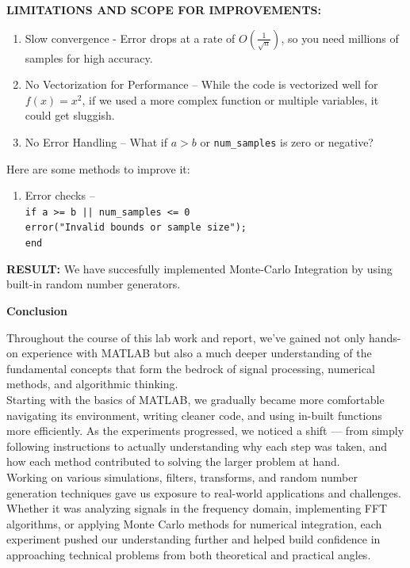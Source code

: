 \documentclass[12pt]{report}
\begin{document}
  \textbf{LIMITATIONS AND SCOPE FOR IMPROVEMENTS:}
  \begin{enumerate}
    \item Slow convergence - Error drops at a rate of  $O \left( \frac{1}{ \sqrt n} \right)$, so you need millions of samples for high accuracy.
    \item No Vectorization for Performance -- While the code is vectorized well for $f(x) = x^2$, if we used a more complex function or multiple variables, it could get sluggish.
    \item No Error Handling -- What if $a > b$ or \texttt{num\_samples} is zero or negative?
  \end{enumerate}
  Here are some methods to improve it:
  \begin{enumerate}
    \item Error checks -- \\ \texttt{if a >= b || num\_samples <= 0 \\
    error("Invalid bounds or sample size");\\
end
}
  \end{enumerate}

  \textbf{RESULT:} We have succesfully implemented Monte-Carlo Integration by using built-in random number generators.

  \newpage 
  \begin{center}
    \textbf{\LARGE Conclusion} \\
    \vspace{0.2cm}
  \end{center}
  Throughout the course of this lab work and report, we’ve gained not only hands-on experience with MATLAB but also a much deeper understanding of the fundamental concepts that form the bedrock of signal processing, numerical methods, and algorithmic thinking. \\

Starting with the basics of MATLAB, we gradually became more comfortable navigating its environment, writing cleaner code, and using in-built functions more efficiently. As the experiments progressed, we noticed a shift — from simply following instructions to actually understanding why each step was taken, and how each method contributed to solving the larger problem at hand.\\

Working on various simulations, filters, transforms, and random number generation techniques gave us exposure to real-world applications and challenges. Whether it was analyzing signals in the frequency domain, implementing FFT algorithms, or applying Monte Carlo methods for numerical integration, each experiment pushed our understanding further and helped build confidence in approaching technical problems from both theoretical and practical angles.\\
\end{document}
